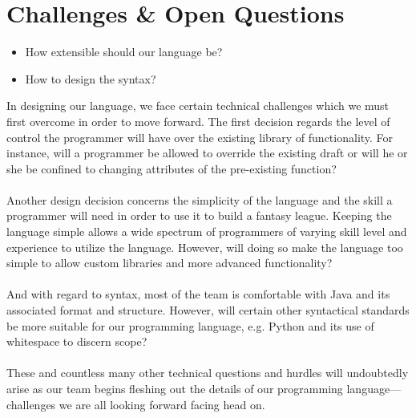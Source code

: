 \documentclass[12pt]{article}
\begin{document}
\section{Challenges \& Open Questions}
\begin{itemize}
\setlength{\itemsep}{1pt}
\item How extensible should our language be?
\item How to design the syntax?
\end{itemize}
In designing our language, we face certain technical challenges which we must first overcome in order to move forward. The first decision regards the level of control the programmer will have over the existing library of functionality. For instance, will a programmer be allowed to override the existing draft or will he or she be confined to changing attributes of the pre-existing function?
\\\\
Another design decision concerns the simplicity of the language and the skill a programmer will need in order to use it to build a fantasy league. Keeping the language simple allows a wide spectrum of programmers of varying skill level and experience to utilize the language. However, will doing so make the language too simple to allow custom libraries and more advanced functionality?
\\\\
And with regard to syntax, most of the team is comfortable with Java and its associated format and structure. However, will certain other syntactical standards be more suitable for our programming language, e.g. Python and its use of whitespace to discern scope?
\\\\
These and countless many other technical questions and hurdles will undoubtedly arise as our team begins fleshing out the details of our programming language---challenges we are all looking forward facing head on.
\end{document}

